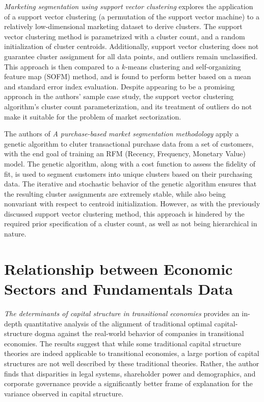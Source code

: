 \documentclass[../main.tex]{subfiles}
\begin{document}
\textit{Marketing segmentation using support vector clustering} explores the application of a support vector clustering (a permutation of the support vector machine) to a relatively low-dimensional marketing dataset to derive clusters. The support vector clustering method is parametrized with a cluster count, and a random initialization of cluster centroids. Additionally, support vector clustering does not guarantee cluster assignment for all data points, and outliers remain unclassified. This approach is then compared to a $k$-means clustering and self-organizing feature map (SOFM) method, and is found to perform better based on a mean and standard error index evaluation. Despite appearing to be a promising approach in the authors' sample case study, the support vector clustering algorithm's cluster count parameterization, and its treatment of outliers do not make it suitable for the problem of market sectorization.

The authors of \textit{A purchase-based market segmentation methodology} apply a genetic algorithm to cluter transactional purchase data from a set of customers, with the end goal of training an RFM (Recency, Frequency, Monetary Value) model. The genetic algorithm, along with a cost function to assess the fidelity of fit, is used to segment customers into unique clusters based on their purchasing data. The iterative and stochastic behavior of the genetic algorithm ensures that the resulting cluster assignments are extremely stable, while also being nonvariant with respect to centroid initialization. However, as with the previously discussed support vector clustering method, this approach is hindered by the required prior specification of a cluster count, as well as not being hierarchical in nature.

\pagebreak

\section{Relationship between Economic Sectors and Fundamentals Data} \label{literature_review:economic_sectors_fundamentals}

\textit{The determinants of capital structure in transitional economies} provides an in-depth quantitative analysis of the alignment of traditional optimal capital-structure dogma against the real-world behavior of companies in transitional economies. The results suggest that while some traditional capital structure theories are indeed applicable to transitional economies, a large portion of capital structures are not well described by these traditional theories. Rather, the author finds that disparities in legal systems, shareholder power and demographics, and corporate governance provide a significantly better frame of explanation for the variance observed in capital structure.
\end{document}
